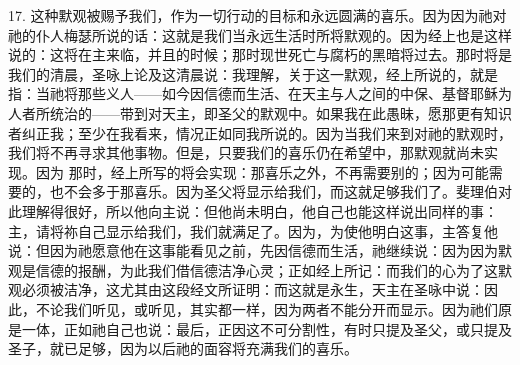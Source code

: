 17. 这种默观被赐予我们，作为一切行动的目标和永远圆满的喜乐。因为因为祂对祂的仆人梅瑟所说的话：这就是我们当永远生活时所将默观的。因为经上也是这样说的：这将在主来临，并且的时候；那时现世死亡与腐朽的黑暗将过去。那时将是我们的清晨，圣咏上论及这清晨说：我理解，关于这一默观，经上所说的，就是指：当祂将那些义人——如今因信德而生活、在天主与人之间的中保、基督耶稣为人者所统治的——带到对天主，即圣父的默观中。如果我在此愚昧，愿那更有知识者纠正我；至少在我看来，情况正如同我所说的。因为当我们来到对祂的默观时，我们将不再寻求其他事物。但是，只要我们的喜乐仍在希望中，那默观就尚未实现。因为  那时，经上所写的将会实现：那喜乐之外，不再需要别的；因为可能需要的，也不会多于那喜乐。因为圣父将显示给我们，而这就足够我们了。斐理伯对此理解得很好，所以他向主说：但他尚未明白，他自己也能这样说出同样的事：主，请将祢自己显示给我们，我们就满足了。因为，为使他明白这事，主答复他说：但因为祂愿意他在这事能看见之前，先因信德而生活，祂继续说：因为因为默观是信德的报酬，为此我们借信德洁净心灵；正如经上所记：而我们的心为了这默观必须被洁净，这尤其由这段经文所证明：而这就是永生，天主在圣咏中说：因此，不论我们听见，或听见，其实都一样，因为两者不能分开而显示。因为祂们原是一体，正如祂自己也说：最后，正因这不可分割性，有时只提及圣父，或只提及圣子，就已足够，因为以后祂的面容将充满我们的喜乐。\par

